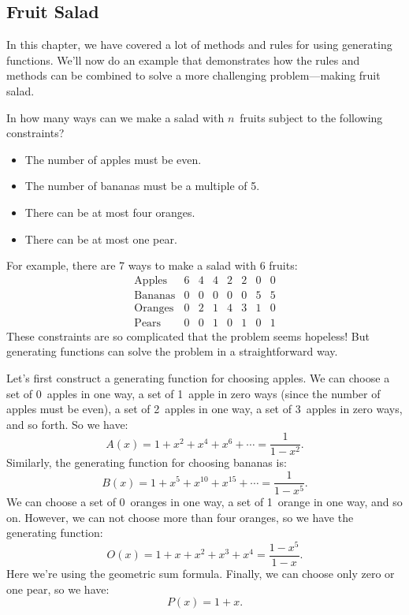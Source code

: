 \begin{problems}
\practiceproblems
{}

\classproblems
{}

\homeworkproblems
{}

\examproblems
{}

\end{problems}

\subsection{Fruit Salad}

In this chapter, we have covered a lot of methods and rules for using
generating functions.  We'll now do an example that demonstrates how
the rules and methods can be combined to solve a more challenging
problem---making fruit salad.

In how many ways can we make a salad with $n$~fruits subject to the
following constraints?
\begin{itemize}
\item The number of apples must be even.
\item The number of bananas must be a multiple of 5.
\item There can be at most four oranges.
\item There can be at most one pear.
\end{itemize}

For example, there are 7 ways to make a salad with 6 fruits:
%
\[
\begin{array}{c|ccccccc}
\text{Apples}  & 6 & 4 & 4 & 2 & 2 & 0 & 0 \\
\text{Bananas} & 0 & 0 & 0 & 0 & 0 & 5 & 5 \\
\text{Oranges} & 0 & 2 & 1 & 4 & 3 & 1 & 0 \\
\text{Pears}   & 0 & 0 & 1 & 0 & 1 & 0 & 1
\end{array}
\]
%
These constraints are so complicated that the problem seems hopeless!
But generating functions can solve the problem in a straightforward
way.

Let's first construct a generating function for choosing apples.  We
can choose a set of 0~apples in one way, a set of 1~apple in zero
ways (since the number of apples must be even), a set of 2~apples in
one way, a set of 3~apples in zero ways, and so forth.  So we have:
%
\[
    A(x) = 1 + x^2 + x^4 + x^6 + \cdots = \frac{1}{1 - x^2}.
\]
%
Similarly, the generating function for choosing bananas is:
%
\[
    B(x) = 1 + x^5 + x^{10} + x^{15} + \cdots = \frac{1}{1 - x^5}.
\]
We can choose a set of 0~oranges in one way, a set of 1~orange in
one way, and so on.  However, we can not choose more than four
oranges, so we have the generating function:
%
\[
    O(x) = 1 + x + x^2 + x^3 + x^4 = \frac{1-x^5}{1-x}.
\]
%
Here we're using the geometric sum formula.  Finally, we can choose
only zero or one pear, so we have:
%
\[
    P(x) = 1 + x.
\]

